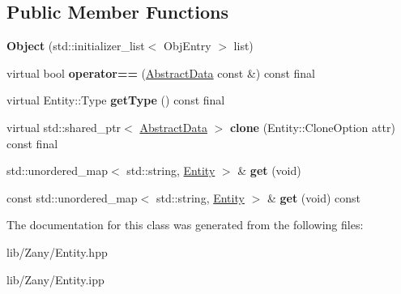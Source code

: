\subsection*{Public Member Functions}
\begin{DoxyCompactItemize}
\item 
\mbox{\label{classzany_1_1_object_a3071077d77c8bf6782914d101ca74469}} 
{\bfseries Object} (std\+::initializer\+\_\+list$<$ Obj\+Entry $>$ list)
\item 
\mbox{\label{classzany_1_1_object_a6e277b7c62546173485b31668fdcaa7f}} 
virtual bool {\bfseries operator==} (\hyperlink{classzany_1_1_abstract_data}{Abstract\+Data} const \&) const final
\item 
\mbox{\label{classzany_1_1_object_a88bc83c06b066c9a9f32916dbd7918a0}} 
virtual Entity\+::\+Type {\bfseries get\+Type} () const final
\item 
\mbox{\label{classzany_1_1_object_a72930a9a163226c675a2bd27e2426fd7}} 
virtual std\+::shared\+\_\+ptr$<$ \hyperlink{classzany_1_1_abstract_data}{Abstract\+Data} $>$ {\bfseries clone} (Entity\+::\+Clone\+Option attr) const final
\item 
\mbox{\label{classzany_1_1_object_a0afef58a628298d6703aaf85dcc47db8}} 
std\+::unordered\+\_\+map$<$ std\+::string, \hyperlink{classzany_1_1_entity}{Entity} $>$ \& {\bfseries get} (void)
\item 
\mbox{\label{classzany_1_1_object_a9aa9db6edfc886cf1ee5761da3ecf303}} 
const std\+::unordered\+\_\+map$<$ std\+::string, \hyperlink{classzany_1_1_entity}{Entity} $>$ \& {\bfseries get} (void) const
\end{DoxyCompactItemize}


The documentation for this class was generated from the following files\+:\begin{DoxyCompactItemize}
\item 
lib/\+Zany/Entity.\+hpp\item 
lib/\+Zany/Entity.\+ipp\end{DoxyCompactItemize}
